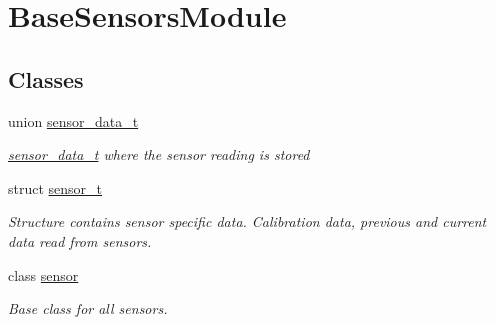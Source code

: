 \hypertarget{group___base_sensors_module}{}\section{Base\+Sensors\+Module}
\label{group___base_sensors_module}
\subsection*{Classes}
\begin{DoxyCompactItemize}
\item 
union \hyperlink{unionsensor__data__t}{sensor\+\_\+data\+\_\+t}
\begin{DoxyCompactList}\small\item\em \hyperlink{unionsensor__data__t}{sensor\+\_\+data\+\_\+t} where the sensor reading is stored \end{DoxyCompactList}\item 
struct \hyperlink{structsensor__t}{sensor\+\_\+t}
\begin{DoxyCompactList}\small\item\em Structure contains sensor specific data. Calibration data, previous and current data read from sensors. \end{DoxyCompactList}\item 
class \hyperlink{classsensor}{sensor}
\begin{DoxyCompactList}\small\item\em Base class for all sensors. \end{DoxyCompactList}\end{DoxyCompactItemize}
